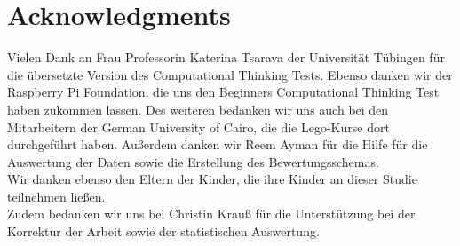 \chapter{Acknowledgments}
Vielen Dank an Frau Professorin Katerina Tsarava der Universität Tübingen für die übersetzte Version des Computational Thinking Tests. Ebenso danken wir der Raspberry Pi Foundation, die uns den Beginners Computational Thinking Test haben zukommen lassen. Des weiteren bedanken wir uns auch bei den Mitarbeitern der German University of Cairo, die die Lego-Kurse dort durchgeführt haben. Außerdem danken wir Reem Ayman für die Hilfe für die Auswertung der Daten sowie die Erstellung des Bewertungsschemas.\\
Wir danken ebenso den Eltern der Kinder, die ihre Kinder an dieser Studie teilnehmen ließen.\\
Zudem bedanken wir uns bei Christin Krauß für die Unterstützung bei der Korrektur der Arbeit sowie der statistischen Auswertung.
